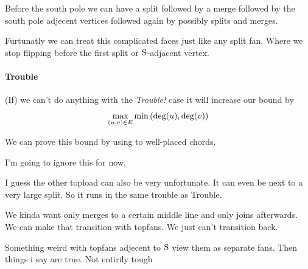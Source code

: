 Before the south pole we can have a split followed by a merge followed by the south pole adjecent vertices followed again by possibly splits and merges.

Furtunatly we can treat this complicated faces just like any split fan. Where we stop flipping before the first split or $\mathrm{S}$-adjacent vertex.



\paragraph{Trouble}
(If) we can't do anything with the \emph{Trouble!} case  it will increase our bound by $$\max_{(u,v) \in E}   \min\left( { \deg(u), \deg(v) } \right)$$

We can prove this bound by using  to well-placed chords. 

I'm going to ignore this for now.

I guess the other topload can also be very unfortunate. It can even be next to a very large split. So it runs in the same trouble as Trouble.

We kinda want only merges to a certain middle line and only joins afterwards. We can make that transition with topfans. We just can't transition back.

Something weird with topfans adjecent to $\mathrm{S}$ view them as separate fans. Then things i say are true. Not entirily tough
